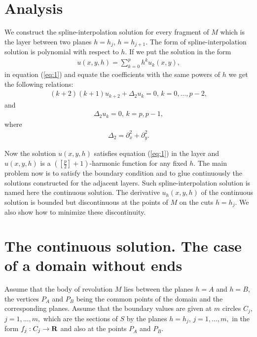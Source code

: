 \documentclass{amsart}
\begin{document}
\section{Analysis}

We construct the spline-interpolation solution for every fragment of
$M$ which is the layer between two planes $h=h_j$, $h=h_{j+1}$. The
form of spline-interpolation solution is polynomial with respect to
$h$. If we put the solution in the form
\begin{eqnarray}
u(x,y,h)=\sum\limits_{k=0}^{p} h^k u_k(x, y),\nonumber
\end{eqnarray}
in equation (\ref{eq:1}) and equate the coefficients with the same
powers of $h$ we get the following relations:
\begin{eqnarray}
(k+2) (k+1)u_{k+2}+\Delta_2 u_{k}=0, \, k=0, \ldots, p-2,\nonumber
\end{eqnarray}
and
\begin{eqnarray}
\Delta_2 u_k=0, \, k=p, p-1,\nonumber
\end{eqnarray}
where
\begin{eqnarray}
\Delta_2=\partial^2_x+\partial^2_y.\nonumber
\end{eqnarray}

Now the solution $u(x,y,h)$ satisfies equation (\ref{eq:1}) in the
layer and $u(x,y,h)$ is a $([\frac{p}{2}]+1)$-harmonic function for
any fixed $h$. The main problem now is to satisfy the boundary
condition and to glue continuously the solutions constructed for the
adjacent layers. Such spline-interpolation solution is named here
the continuous solution. The derivative $u_h(x,y,h)$ of the
continuous solution is bounded but discontinuous at the points of
$M$ on the cuts $h=h_j$. We also show how to minimize these
discontinuity.



\section{The continuous solution. The case of a domain without ends}

Assume that the body of revolution $M$ lies between the planes $h=A$
and $h=B$, the vertices $P_A$ and $P_B$ being the common points of
the domain and the corresponding planes. Assume that the boundary
values are given at $m$ circles $C_j$, $j=1,...,m,$ which are the
sections of $S$ by the planes $h=h_j$, $j=1,...,m,$ in the form
$f_j: C_j \to \bf{R}$ and also at the points $P_A$ and $P_B$.
\end{document}

